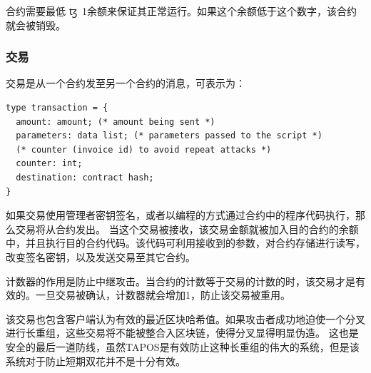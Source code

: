\documentclass[letterpaper]{article}
\newcommand{\tz}{{\fontspec{DejaVu Sans} \small{ꜩ}}}
\begin{document}
合约需要最低\tz~\num{1}余额来保证其正常运行。如果这个余额低于这个数字，该合约就会被销毁。
\subsubsection{交易}

交易是从一个合约发至另一个合约的消息，可表示为：

\begin{lstlisting}
type transaction = {
  amount: amount; (* amount being sent *)
  parameters: data list; (* parameters passed to the script *)
  (* counter (invoice id) to avoid repeat attacks *)
  counter: int;
  destination: contract hash;
}
\end{lstlisting}

如果交易使用管理者密钥签名，或者以编程的方式通过合约中的程序代码执行，那么交易将从合约发出。
当这个交易被接收，该交易金额就被加入目的合约的余额中，并且执行目的合约代码。该代码可利用接收到的参数，对合约存储进行读写，改变签名密钥，以及发送交易至其它合约。

计数器的作用是防止中继攻击。当合约的计数等于交易的计数的时，该交易才是有效的。一旦交易被确认，计数器就会增加1，防止该交易被重用。

该交易也包含客户端认为有效的最近区块哈希值。如果攻击者成功地迫使一个分叉进行长重组，这些交易将不能被整合入区块链，使得分叉显得明显伪造。
这也是安全的最后一道防线，虽然TAPOS是有效防止这种长重组的伟大的系统，但是该系统对于防止短期双花并不是十分有效。
\end{document}
